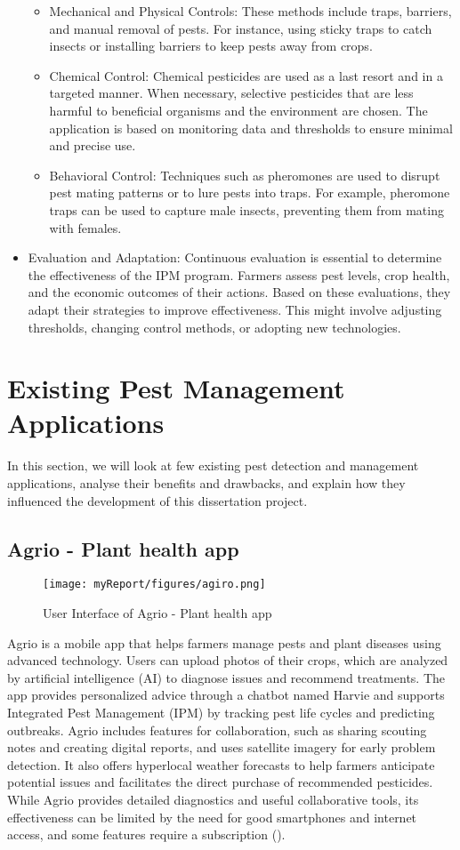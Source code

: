 \begin{itemize}
\begin{itemize}
        \item Mechanical and Physical Controls: These methods include traps, barriers, and manual removal of pests. For instance, using sticky traps to catch insects or installing barriers to keep pests away from crops.
        \item Chemical Control: Chemical pesticides are used as a last resort and in a targeted manner. When necessary, selective pesticides that are less harmful to beneficial organisms and the environment are chosen. The application is based on monitoring data and thresholds to ensure minimal and precise use.
        \item Behavioral Control: Techniques such as pheromones are used to disrupt pest mating patterns or to lure pests into traps. For example, pheromone traps can be used to capture male insects, preventing them from mating with females.
    \end{itemize}
    \item Evaluation and Adaptation: Continuous evaluation is essential to determine the effectiveness of the IPM program. Farmers assess pest levels, crop health, and the economic outcomes of their actions. Based on these evaluations, they adapt their strategies to improve effectiveness. This might involve adjusting thresholds, changing control methods, or adopting new technologies.
\end{itemize}

\section{Existing Pest Management Applications}
In this section, we will look at few existing pest detection and management applications, analyse their benefits and drawbacks, and explain how they influenced the development of this dissertation project.

\subsection{Agrio - Plant health app}
\begin{figure}[ht]
\texttt{[image: myReport/figures/agiro.png]}
\caption{User Interface of Agrio - Plant health app}
\end{figure}
Agrio is a mobile app that helps farmers manage pests and plant diseases using advanced technology. Users can upload photos of their crops, which are analyzed by artificial intelligence (AI) to diagnose issues and recommend treatments. The app provides personalized advice through a chatbot named Harvie and supports Integrated Pest Management (IPM) by tracking pest life cycles and predicting outbreaks. Agrio includes features for collaboration, such as sharing scouting notes and creating digital reports, and uses satellite imagery for early problem detection. It also offers hyperlocal weather forecasts to help farmers anticipate potential issues and facilitates the direct purchase of recommended pesticides. While Agrio provides detailed diagnostics and useful collaborative tools, its effectiveness can be limited by the need for good smartphones and internet access, and some features require a subscription (\cite{agrio_protect}).


